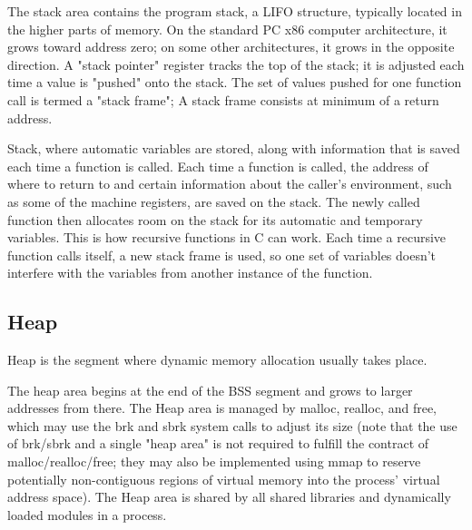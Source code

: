     The stack area contains the program stack, a LIFO structure, typically located in the higher parts of memory. On the standard PC x86 computer architecture, it grows toward address zero; on some other architectures, it grows in the opposite direction. A "stack pointer" register tracks the top of the stack; it is adjusted each time a value is "pushed" onto the stack. The set of values pushed for one function call is termed a "stack frame"; A stack frame consists at minimum of a return address.

    Stack, where automatic variables are stored, along with information that is saved each time a function is called. Each time a function is called, the address of where to return to and certain information about the caller's environment, such as some of the machine registers, are saved on the stack. The newly called function then allocates room on the stack for its automatic and temporary variables. This is how recursive functions in C can work. Each time a recursive function calls itself, a new stack frame is used, so one set of variables doesn't interfere with the variables from another instance of the function.
    
    \subsection{Heap}
    Heap is the segment where dynamic memory allocation usually takes place.
    
    The heap area begins at the end of the BSS segment and grows to larger addresses from there. The Heap area is managed by malloc, realloc, and free, which may use the brk and sbrk system calls to adjust its size (note that the use of brk/sbrk and a single "heap area" is not required to fulfill the contract of malloc/realloc/free; they may also be implemented using mmap to reserve potentially non-contiguous regions of virtual memory into the process' virtual address space). The Heap area is shared by all shared libraries and dynamically loaded modules in a process.